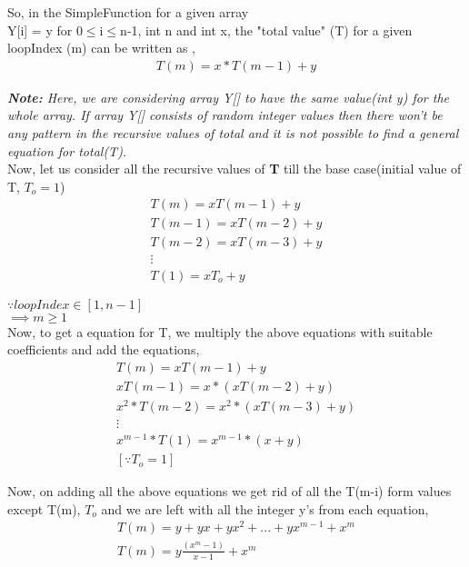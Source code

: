 \documentclass[journal,12pt,twocolumn]{IEEEtran}
\begin{document}
So, in the SimpleFunction for a given array \\ Y[i] = y for 0$\le$i$\le$n-1, int n and int x, the "total value" (T) for a given loopIndex (m) can be written as ,
\begin{align}
    T(m) = x*T(m-1) + y
\end{align}

\emph{\textbf{Note:} Here, we are considering array Y[] to have the same value(int y) for the whole array. If array Y[] consists of random integer values then there won't be any pattern in the recursive values of total and it is not possible to find a general equation for total(T).} \\

Now, let us consider all the recursive values of \textbf{T} till the base case(initial value of T, $T_{o} = 1$) 
\begin{gather}
    T(m) = xT(m-1) + y \\
    T(m-1) = xT(m-2) + y \\
    T(m-2) = xT(m-3) + y \\
    \vdots\\
    T(1) = xT_{o} + y   
\end{gather}

$\because loopIndex \in [1,n-1]$ \\
$\implies m\ge1$\\

Now, to get a equation for T, we multiply the above equations with suitable coefficients and add the equations,
\begin{gather}
    T(m) = xT(m-1) + y \\
    xT(m-1) = x*(xT(m-2) + y) \\
    x^{2}*T(m-2) = x^{2}*(xT(m-3) + y) \\
    \vdots\\
    x^{m-1}*T(1) = x^{m-1}*(x + y) \\
    [\because T_{o} = 1] 
\end{gather}

\newpage

Now, on adding all the above equations we get rid of all the T(m-i) form values except T(m), $T_{o}$ and we are left with all the integer y's from each equation,
\begin{gather}
    T(m) = y + yx + yx^{2} + ... + yx^{m-1} + x^{m} \\
    T(m) = y\frac{(x^{m} - 1)}{x - 1} + x^{m} 
\end{gather}
\end{document}
